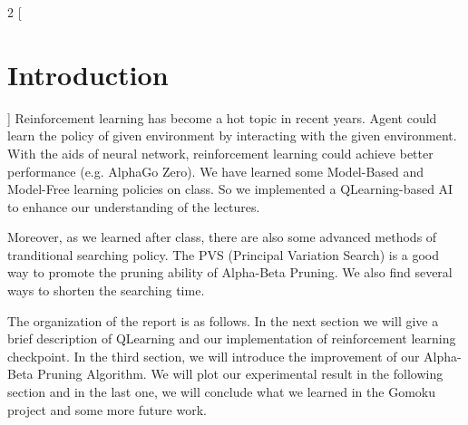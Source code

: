 \documentclass[a4paper, 12pt]{article} %
\begin{document}
	\begin{multicols}{2}
		[
		\section{Introduction}
		]
		Reinforcement learning has become a hot topic in recent years. Agent could learn the policy of given environment by interacting with the given environment. With the aids of neural network, reinforcement learning could achieve better performance (e.g. AlphaGo Zero). We have learned some Model-Based and Model-Free learning policies on class. So we implemented a QLearning-based AI to enhance our understanding of the lectures.
		
		Moreover, as we learned after class, there are also some advanced methods of tranditional searching policy. The PVS (Principal Variation Search) is a good way to promote the pruning ability of Alpha-Beta Pruning. We also find several ways to shorten the searching time.
		
		The organization of the report is as follows. In the next section we will give a brief description of QLearning and our implementation of reinforcement learning checkpoint. In the third section, we will introduce the improvement of our Alpha-Beta Pruning Algorithm. We will plot our experimental result in the following section and in the last one, we will conclude what we learned in the Gomoku project and some more future work.
		
		
	\end{multicols}
	
	\bigskip
	
	
\end{document}
